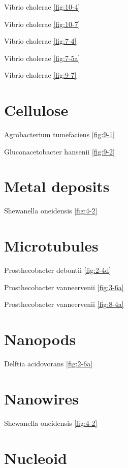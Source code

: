 \documentclass[]{tufte-book}
\begin{document}
Vibrio cholerae \ref{fig:10-4}

Vibrio cholerae \ref{fig:10-7}

Vibrio cholerae \ref{fig:7-4}

Vibrio cholerae \ref{fig:7-5a}

Vibrio cholerae \ref{fig:9-7}

\section*{Cellulose}\label{cellulose-1}

Agrobacterium tumefaciens \ref{fig:9-1}

Gluconacetobacter hansenii \ref{fig:9-2}

\section*{Metal deposits}\label{metal-deposits}

Shewanella oneidensis \ref{fig:4-2}

\section*{Microtubules}\label{microtubules}

Prosthecobacter debontii \ref{fig:2-4d}

Prosthecobacter vanneervenii \ref{fig:3-6a}

Prosthecobacter vanneervenii \ref{fig:8-4a}

\section*{Nanopods}\label{nanopods}

Delftia acidovorans \ref{fig:2-6a}

\section*{Nanowires}\label{nanowires}

Shewanella oneidensis \ref{fig:4-2}

\section*{Nucleoid}\label{nucleoid}
\end{document}
